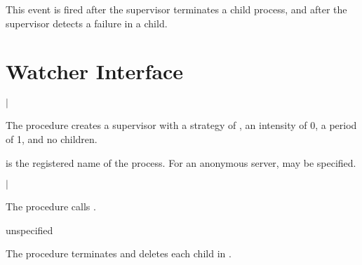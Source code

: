 This event is fired after the supervisor terminates a child process,
and after the supervisor detects a failure in a child.

\section {Watcher Interface}

\begin{procedure}
\end{procedure}

\returns{}
 $|$

The  procedure creates a supervisor with a
strategy of , an intensity of 0, a period of 1,
and no children.

 is the registered name of the process. For an anonymous
server,  may be specified.

\begin{procedure}
\end{procedure}

\returns{}
 $|$

The  procedure calls
.

\begin{procedure}
\end{procedure}

\returns{} unspecified

The  procedure terminates and
deletes each  child in .
